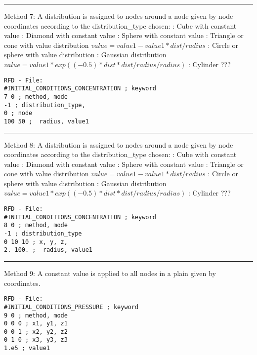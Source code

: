 \hrule
Method 7:
A distribution is assigned to nodes around a node given by node coordinates according
to the distribution\_type chosen: :  Cube with constant value :  Diamond with constant value :  Sphere with constant value :  Triangle or cone with value distribution $value = value1 - value1*dist/radius$ :  Circle or sphere with value distribution :  Gaussian distribution $value=value1*exp((-0.5)*dist*dist/radius/radius)$ :  Cylinder ???
%
\small
\begin{verbatim}
RFD - File:
#INITIAL_CONDITIONS_CONCENTRATION ; keyword
7 0 ; method, mode
-1 ; distribution_type,
0 ; node
100 50 ;  radius, value1
\end{verbatim}
\normalsize

\hrule
Method 8:
A distribution is assigned to nodes around a node given by node coordinates according
to the distribution\_type chosen: :  Cube with constant value :  Diamond with constant value :  Sphere with constant value :  Triangle or cone with value distribution $value = value1 - value1*dist/radius$ :  Circle or sphere with value distribution :  Gaussian distribution $value=value1*exp((-0.5)*dist*dist/radius/radius)$ :  Cylinder ???
%
\small
\begin{verbatim}
RFD - File:
#INITIAL_CONDITIONS_CONCENTRATION ; keyword
8 0 ; method, mode
-1 ; distribution_type
0 10 10 ; x, y, z,
2. 100. ;  radius, value1
\end{verbatim}
\normalsize

\hrule
Method 9:
A constant value is applied to all nodes in a plain given by coordinates.
%
\small
\begin{verbatim}
RFD - File:
#INITIAL_CONDITIONS_PRESSURE ; keyword
9 0 ; method, mode
0 0 0 ; x1, y1, z1
0 0 1 ; x2, y2, z2
0 1 0 ; x3, y3, z3
1.e5 ; value1
\end{verbatim}
\normalsize

